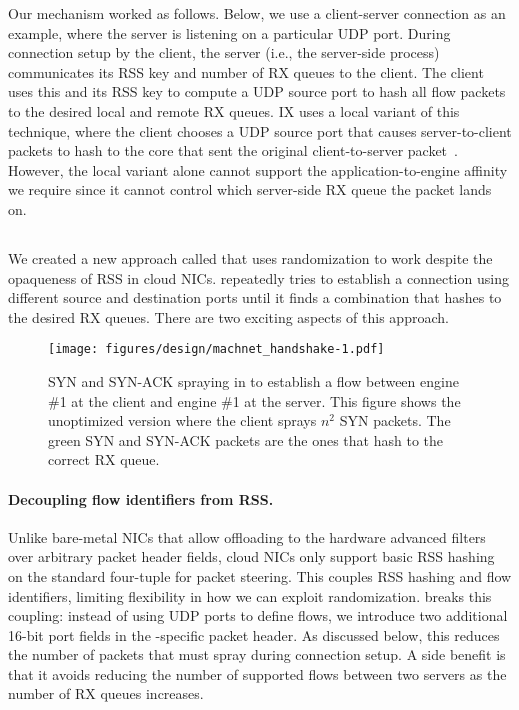 Our mechanism worked as follows.
Below, we use a client-server connection as an example, where the server is listening on a particular UDP port.
During connection setup by the client, the server (i.e., the server-side \mt{} process) communicates its RSS key and number of RX queues to the client.
The client uses this and its RSS key to compute a UDP source port to hash all flow packets to the desired local and remote RX queues.
IX uses a local variant of this technique, where the client chooses a UDP source port that causes server-to-client packets to hash to the core that sent the original client-to-server packet~\cite{belay2014ix}.
However, the local variant alone cannot support the application-to-engine affinity we require since it cannot control which server-side RX queue the packet lands on.

\subsection{\rssminus{}}
\label{subsec:rssminus}
We created a new approach called \rssminus{} that uses randomization to work despite the opaqueness of RSS in cloud NICs.
\mt{} repeatedly tries to establish a connection using different source and destination ports until it finds a combination that hashes to the desired RX queues.
There are two exciting aspects of this approach.

\begin{figure}
    \centering
    \texttt{[image: figures/design/machnet\_handshake-1.pdf]}
    \caption{SYN and SYN-ACK spraying in \mt{} to establish a flow between engine \#1 at the client and engine \#1 at the server.
    This figure shows the unoptimized version where the client sprays $n^2$ SYN packets. The green SYN and SYN-ACK packets are the ones that hash to the correct RX queue.}
    \label{fig:machnet_handshake}
    \vspace{-0.1in}
\end{figure}

\paragraph{Decoupling flow identifiers from RSS.}
Unlike bare-metal NICs that allow offloading to the hardware advanced filters over arbitrary packet header fields, cloud NICs only support basic RSS hashing on the standard four-tuple for packet steering.
This couples RSS hashing and flow identifiers, limiting flexibility in how we can exploit randomization.
\mt{} breaks this coupling: instead of using UDP ports to define flows, we introduce two additional 16-bit port fields in the \mt{}-specific packet header.
As discussed below, this reduces the number of packets that \mt{} must spray during connection setup.
A side benefit is that it avoids reducing the number of supported flows between two servers as the number of RX queues increases.

